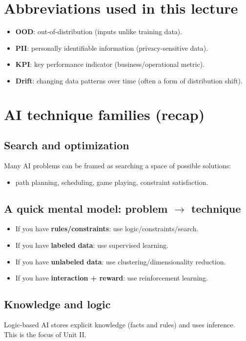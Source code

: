 \documentclass[11pt]{article}
\begin{document}
\section{Abbreviations used in this lecture}
\begin{itemize}[leftmargin=*]
  \item \textbf{OOD}: out-of-distribution (inputs unlike training data).
  \item \textbf{PII}: personally identifiable information (privacy-sensitive data).
  \item \textbf{KPI}: key performance indicator (business/operational metric).
  \item \textbf{Drift}: changing data patterns over time (often a form of distribution shift).
\end{itemize}

\section{AI technique families (recap)}
\subsection{Search and optimization}
Many AI problems can be framed as searching a space of possible solutions:
\begin{itemize}[leftmargin=*]
  \item path planning, scheduling, game playing, constraint satisfaction.
\end{itemize}

\subsection{A quick mental model: problem $\rightarrow$ technique}
\begin{itemize}[leftmargin=*]
  \item If you have \textbf{rules/constraints}: use logic/constraints/search.
  \item If you have \textbf{labeled data}: use supervised learning.
  \item If you have \textbf{unlabeled data}: use clustering/dimensionality reduction.
  \item If you have \textbf{interaction + reward}: use reinforcement learning.
\end{itemize}

\subsection{Knowledge and logic}
Logic-based AI stores explicit knowledge (facts and rules) and uses inference. This is the focus of Unit II.
\end{document}
